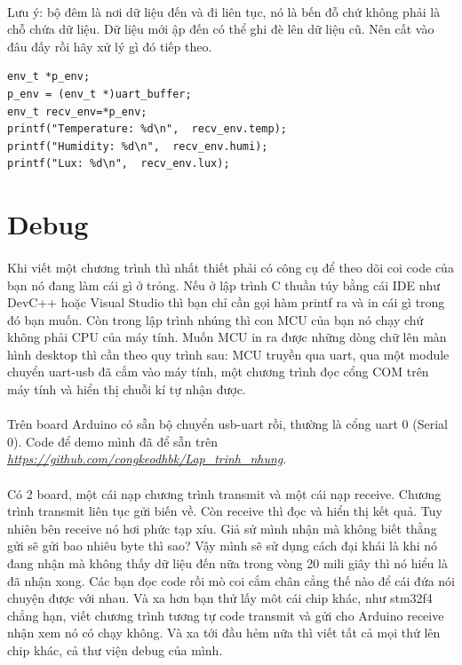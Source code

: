 \documentclass[12pt,a5paper]{book}
\begin{document}
\paragraph{}
Lưu ý: bộ đêm là nơi dữ liệu đến và đi liên tục, nó là bến đỗ chứ không phải là chỗ chứa dữ liệu. Dữ liệu mới ập đến có thể ghi đè lên dữ liệu cũ. Nên cất vào đâu đấy rồi hãy xử lý gì đó tiếp theo.
\begin{lstlisting}
env_t *p_env;
p_env = (env_t *)uart_buffer;
env_t recv_env=*p_env;
printf("Temperature: %d\n",  recv_env.temp);
printf("Humidity: %d\n",  recv_env.humi);
printf("Lux: %d\n",  recv_env.lux);
\end{lstlisting}
\section{Debug}
\paragraph{}
Khi viết một chương trình thì nhất thiết phải có công cụ để theo dõi coi code của bạn nó đang làm cái gì ở trỏng. Nếu ở lập trình C thuần túy bằng cái IDE như DevC++ hoặc Visual Studio thì bạn chỉ cần gọi hàm printf ra và in cái gì trong đó bạn muốn. Còn trong lập trình nhúng thì con MCU của bạn nó chạy chứ không phải CPU của máy tính. Muốn MCU in ra được những dòng chữ lên màn hình desktop thì cần theo quy trình sau: MCU truyền qua uart, qua một module chuyển uart-usb đã cắm vào máy tính, một chương trình đọc cổng COM trên máy tính và hiển thị chuỗi kí tự nhận được.
\paragraph{}
Trên board Arduino có sẵn bộ chuyển usb-uart rồi, thường là cổng uart 0 (Serial 0). Code để demo mình đã để sẵn trên \textit{\url{https://github.com/congkeodhbk/Lap_trinh_nhung}}. 
\paragraph{}
Có 2 board, một cái nạp chương trình transmit và một cái nạp receive. Chương trình transmit liên tục gửi biến về. Còn receive thì đọc và hiển thị kết quả. Tuy nhiên bên receive nó hơi phức tạp xíu. Giả sử mình nhận mà không biết thằng gửi sẽ gửi bao nhiêu byte thì sao? Vậy mình sẽ sử dụng cách đại khái là khi nó đang nhận mà không thấy dữ liệu đến nữa trong vòng 20 mili giây thì nó hiểu là đã nhận xong. Các bạn đọc code rồi mò coi cắm chân cẳng thế nào để cái đứa nói chuyện được với nhau. Và xa hơn bạn thử lấy môt cái chip khác, như stm32f4 chẳng hạn, viết chương trình tương tự code transmit và gửi cho Arduino receive nhận xem nó có chạy không. Và xa tới đầu hẻm nữa thì viết tất cả mọi thứ lên chip khác, cả thư viện debug của mình.
\end{document}
